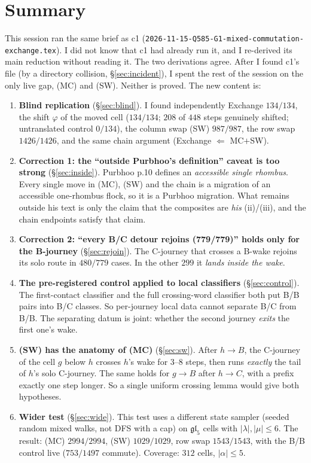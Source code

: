 \documentclass[11pt]{article}
\theoremstyle{definition}
\newcommand{\toB}{\!\to\!B}
\newcommand{\toC}{\!\to\!C}
\begin{document}
\section*{Summary}
This session ran the same brief as c1 (\texttt{2026-11-15-Q585-G1-mixed-commutation-exchange.tex}). I did not know that c1 had already
run it, and I re-derived its main reduction without reading it. The two derivations agree.
After I found c1's file (by a directory collision, \S\ref{sec:incident}), I spent the rest of the session on the only live gap,
(MC) and (SW). Neither is proved. The new content is:
\begin{enumerate}
\item \textbf{Blind replication} (\S\ref{sec:blind}). I found independently Exchange $134/134$, the shift $\varphi$ of the moved cell
($134/134$; $208$ of $448$ steps genuinely shifted; untranslated control $0/134$), the column swap (SW) $987/987$, the row swap
$1426/1426$, and the same chain argument (Exchange $\Leftarrow$ MC$+$SW).
\item \textbf{Correction 1: the ``outside Purbhoo's definition'' caveat is too strong} (\S\ref{sec:inside}). Purbhoo p.10 defines
an \emph{accessible single rhombus}. Every single move in (MC), (SW) and the chain is a migration of an accessible one-rhombus flock,
so it is a Purbhoo migration. What remains outside his text is only the claim that the composites are \emph{his} (ii)/(iii), and
the chain endpoints satisfy that claim.
\item \textbf{Correction 2: ``every B/C detour rejoins (779/779)'' holds only for the B-journey} (\S\ref{sec:rejoin}). The C-journey
that crosses a B-wake rejoins its solo route in $480/779$ cases. In the other $299$ it \emph{lands inside the wake}.
\item \textbf{The pre-registered control applied to local classifiers} (\S\ref{sec:control}). The first-contact classifier and the full
crossing-word classifier both put B/B pairs into B/C classes. So per-journey local data cannot separate B/C from B/B. The
separating datum is joint: whether the second journey \emph{exits} the first one's wake.
\item \textbf{(SW) has the anatomy of (MC)} (\S\ref{sec:sw}). After $h\toB$, the C-journey of the cell $g$ below $h$ crosses $h$'s
wake for $3$--$8$ steps, then runs \emph{exactly} the tail of $h$'s solo C-journey. The same holds for $g\toB$ after $h\toC$, with a
prefix exactly one step longer. So a single uniform crossing lemma would give both hypotheses.
\item \textbf{Wider test} (\S\ref{sec:wide}). This test uses a different state sampler (seeded random mixed walks, not DFS with a cap)
on $\mathfrak{gl}_5$ cells with $|\lambda|,|\mu|\le6$. The result: (MC) $2994/2994$, (SW) $1029/1029$, row swap $1543/1543$, with the B/B control live ($753/1497$ commute). Coverage: $312$ cells, $|\alpha|\le5$.
\end{enumerate}
\end{document}
